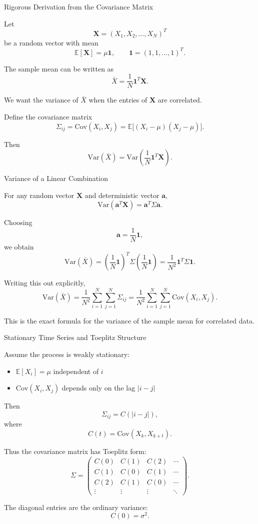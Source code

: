 \documentclass{beamer}
\begin{document}
\begin{frame}{Rigorous Derivation from the Covariance Matrix}

Let
\[
\bm{X} = (X_1,X_2,\dots,X_N)^T
\]
be a random vector with mean
\[
\mathbb{E}[\bm{X}] = \mu \bm{1},
\qquad
\bm{1} = (1,1,\dots,1)^T .
\]

The sample mean can be written as
\[
\bar X = \frac{1}{N}\bm{1}^T \bm{X}.
\]

We want the variance of $\bar X$ when the entries of $\bm{X}$ are correlated.

Define the covariance matrix
\[
\Sigma_{ij} = \mathrm{Cov}(X_i,X_j)
= \mathbb{E}\big[(X_i-\mu)(X_j-\mu)\big].
\]

Then
\[
\mathrm{Var}(\bar X)
=
\mathrm{Var}\left(\frac{1}{N}\bm{1}^T\bm{X}\right).
\]
\end{frame}

\begin{frame}{Variance of a Linear Combination}

For any random vector $\bm{X}$ and deterministic vector $\bm{a}$,
\[
\mathrm{Var}(\bm{a}^T\bm{X}) = \bm{a}^T \Sigma \bm{a}.
\]

Choosing
\[
\bm{a} = \frac{1}{N}\bm{1},
\]
we obtain
\[
\mathrm{Var}(\bar X)
=
\left(\frac{1}{N}\bm{1}\right)^T
\Sigma
\left(\frac{1}{N}\bm{1}\right)
=
\frac{1}{N^2}\bm{1}^T\Sigma\bm{1}.
\]

Writing this out explicitly,
\[
\mathrm{Var}(\bar X)
=
\frac{1}{N^2}\sum_{i=1}^N \sum_{j=1}^N \Sigma_{ij}
=
\frac{1}{N^2}\sum_{i=1}^N \sum_{j=1}^N \mathrm{Cov}(X_i,X_j).
\]

This is the exact formula for the variance of the sample mean for correlated data.
\end{frame}

\begin{frame}{Stationary Time Series and Toeplitz Structure}

Assume the process is weakly stationary:

\begin{itemize}
\item $\mathbb{E}[X_i]=\mu$ independent of $i$
\item $\mathrm{Cov}(X_i,X_j)$ depends only on the lag $|i-j|$
\end{itemize}

Then
\[
\Sigma_{ij} = C(|i-j|),
\]
where
\[
C(t)=\mathrm{Cov}(X_k,X_{k+t}).
\]

Thus the covariance matrix has Toeplitz form:
\[
\Sigma =
\begin{pmatrix}
C(0) & C(1) & C(2) & \cdots \\
C(1) & C(0) & C(1) & \cdots \\
C(2) & C(1) & C(0) & \cdots \\
\vdots & \vdots & \vdots & \ddots
\end{pmatrix}.
\]

The diagonal entries are the ordinary variance:
\[
C(0)=\sigma^2.
\]
\end{frame}
\end{document}
